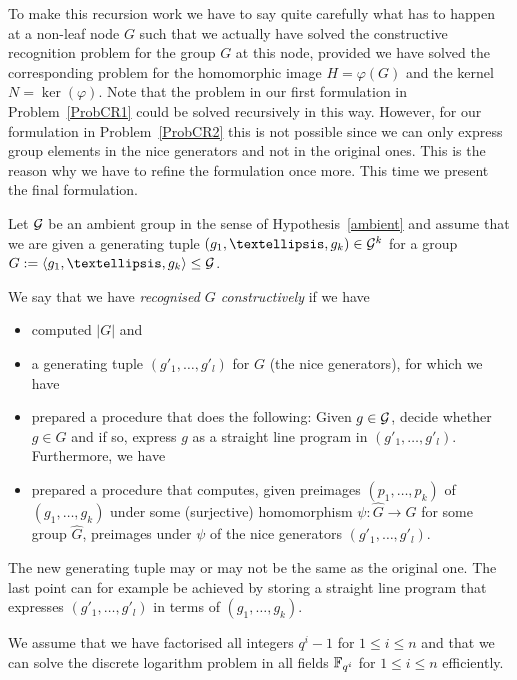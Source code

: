 To make this recursion work we have to say quite carefully what has to
happen at a non-leaf node $G$ such that we actually have solved the
constructive recognition problem for the group $G$ at this node, provided
we have solved the corresponding problem for the homomorphic image
$H=\varphi(G)$ and the kernel $N = \ker(\varphi)$. Note that the problem
in our first formulation in Problem~\ref{ProbCR1} could be solved
recursively in this way. However, for our formulation in Problem~\ref{ProbCR2}
this is not possible since we can only express group elements in the nice
generators and not in the original ones. This is the reason why we have to
refine the formulation once more. This time we present the final
formulation.

\begin{Problem}
\label{ProbCR3}%
%
Let $\mathcal{G}$ be an ambient group in the sense of Hypothesis~\ref{ambient} and 
assume that we are given a generating tuple $(g_1, \ldots, g_k) \in
\GG^k$ for a group $G := \left< g_1, \ldots, g_k \right> \le \GG$. 

We say that we have \emph{recognised $G$ constructively} if we have 
\begin{itemize}
\item computed $|G|$ and
\item a generating tuple $( g'_1, \ldots, g'_l )$ for $G$ (the nice
generators), for which we have
\item 
prepared a procedure that does the following: Given $g \in \mathcal{G}$,
decide whether $g \in G$ and if so, express $g$ as a straight line program
%
in $(g'_1, \ldots, g'_l)$. Furthermore, we have
\item prepared a procedure that computes, given preimages $(p_1, \ldots,
p_k)$ of $(g_1, \ldots, g_k)$ under some (surjective) homomorphism $\psi
: \hat G \to G$ for some group $\hat G$, preimages under $\psi$ of the
nice generators $(g'_1, \ldots, g'_l)$.
\end{itemize}
%
The new generating tuple may or may not be the same as the original one.
The last point can for example be achieved by storing a straight line
program that expresses $(g'_1, \ldots, g'_l)$ in terms of $(g_1, \ldots,
g_k)$.

We assume that we have factorised all integers $q^i-1$ for $1 \le i \le n$
and that we can solve the discrete logarithm problem in all fields
$\mathbb{F}_{q^i}$ for $1 \le i \le n$ efficiently. 


\end{Problem}
